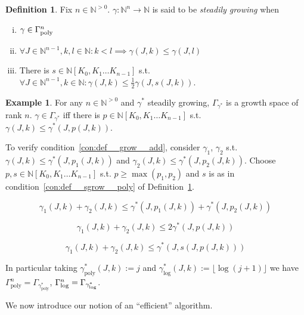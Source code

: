 \documentclass{article}
\numberwithin{equation}{section}
\theoremstyle{definition}
\newtheorem{definition}{Definition}[section]
\newtheorem{example}{Example}[section]
\theoremstyle{plain}
\newcommand{\Nats}{\mathbb{N}}
\newcommand{\NatPoly}{\Nats[K_0, K_1 \ldots K_{n-1}]}
\newcommand{\NatFun}{\Nats^n \rightarrow}
\newcommand{\Floor}[1]{\lfloor #1 \rfloor}
\newcommand{\GammaPoly}{\Gamma_{\textnormal{poly}}}
\newcommand{\GammaLog}{\Gamma_{\textnormal{log}}}
\begin{document}
\begin{samepage}
\begin{definition}
\label{def:sgrow}
Fix ${n \in \Nats^{>0}}$. ${\gamma: \NatFun \Nats}$ is said to be \emph{steadily growing} when
\begin{enumerate}[(i)]
\item ${\gamma \in \GammaPoly^n}$
\item ${\forall J \in \Nats^{n-1}, k,l \in \Nats: k < l \implies \gamma(J,k) \leq \gamma(J,l)}$
\item\label{con:def__sgrow__poly} There is ${s \in \NatPoly}$ s.t. ${\forall J \in \Nats^{n-1}, k \in \Nats: \gamma(J,k) \leq \frac{1}{2}\gamma(J,s(J,k))}$.
\end{enumerate}
\end{definition}
\end{samepage}

\begin{samepage}
\begin{example}

For any ${n \in \Nats^{>0}}$ and ${\gamma^*}$ steadily growing, ${\Gamma_{\gamma^*}}$ is a growth space of rank ${n}$. ${\gamma \in \Gamma_{\gamma^*}}$ iff there is ${p \in \NatPoly}$ s.t. ${\gamma(J,k) \leq \gamma^*(J,p(J,k))}$. 

To verify condition~\ref{con:def__grow__add}, consider ${\gamma_1}$, ${\gamma_2}$ s.t. ${\gamma(J,k) \leq \gamma^*(J,p_1(J,k))}$ and ${\gamma_2(J,k) \leq \gamma^*(J,p_2(J,k))}$. Choose ${p,s \in \NatPoly}$ s.t. ${p \geq \max(p_1,p_2)}$ and ${s}$ is as in condition~\ref{con:def__sgrow__poly} of Definition~\ref{def:sgrow}.

\[\gamma_1(J,k)+\gamma_2(J,k) \leq \gamma^*(J,p_1(J,k))+\gamma^*(J,p_2(J,k))\]

\[\gamma_1(J,k)+\gamma_2(J,k) \leq 2\gamma^*(J,p(J,k))\]

\[\gamma_1(J,k)+\gamma_2(J,k) \leq \gamma^*(J,s(J,p(J,k)))\]

In particular taking ${\gamma^*_{\text{poly}}(J,k):=j}$ and ${\gamma^*_{\text{log}}(J,k):=\Floor{\log (j+1)}}$ we have ${\Gamma_{\text{poly}}^n=\Gamma_{\gamma^*_{\text{poly}}}}$, ${\GammaLog^n=\Gamma_{\gamma^*_{\text{log}}}}$.

\end{example}
\end{samepage}

We now introduce our notion of an \enquote{efficient} algorithm.
\end{document}
